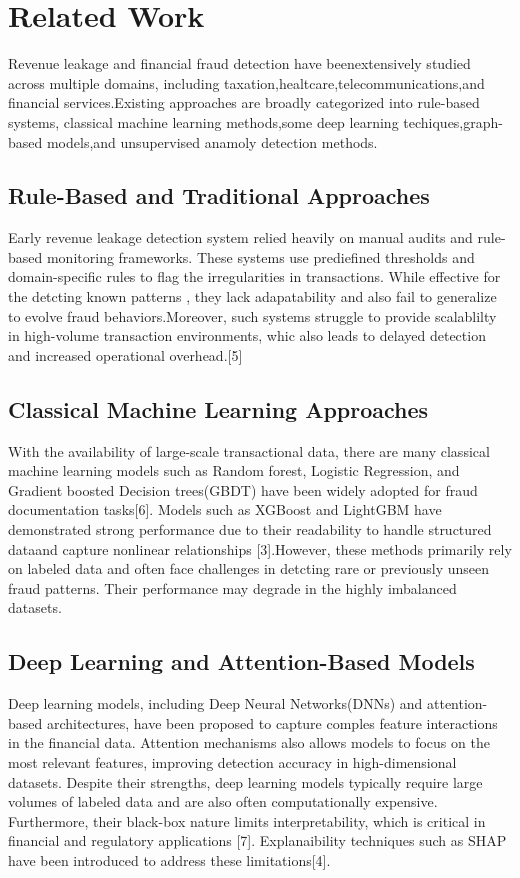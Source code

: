 \documentclass[conference]{IEEEtran}
\begin{document}

\section{Related Work}

Revenue leakage and financial fraud detection have beenextensively studied across multiple domains, including taxation,healtcare,telecommunications,and financial services.Existing approaches are broadly categorized into rule-based systems, classical machine learning methods,some deep learning techiques,graph-based models,and unsupervised anamoly detection methods.      


\subsection{Rule-Based and Traditional Approaches}
Early revenue leakage detection system relied heavily on manual audits and rule-based monitoring frameworks. These systems use prediefined thresholds and domain-specific rules to flag the irregularities in transactions. While effective for the detcting known patterns , they lack adapatability and also fail to generalize to evolve fraud behaviors.Moreover, such systems struggle to provide scalablilty in high-volume transaction environments, whic also leads to delayed detection and increased operational overhead.[5]


\subsection{Classical Machine Learning Approaches}

With the availability of large-scale transactional data, there are many classical machine learning models such as Random forest, Logistic Regression, and Gradient boosted Decision trees(GBDT) have been widely adopted for fraud documentation tasks[6]. Models such as XGBoost and LightGBM have demonstrated strong performance due to their readability to handle structured dataand capture nonlinear relationships [3].However, these methods primarily rely on labeled data and often face challenges in detcting rare or previously unseen fraud patterns. Their performance may degrade in the highly imbalanced datasets.


\subsection{Deep Learning and Attention-Based Models}
Deep learning models, including Deep Neural Networks(DNNs) and attention-based architectures, have been proposed to capture comples feature interactions in the financial data. Attention mechanisms also allows models to focus on the most relevant features, improving detection accuracy in high-dimensional datasets. Despite their strengths, deep learning models typically require large volumes of labeled data and are also often computationally expensive. Furthermore, their black-box nature limits interpretability, which is critical in financial and regulatory applications [7]. Explanaibility techniques such as SHAP have been introduced to address these limitations[4].
\end{document}
